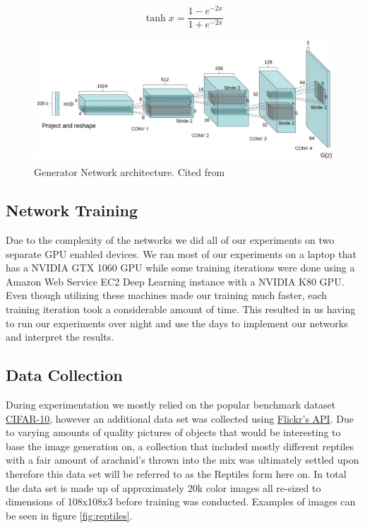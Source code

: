 \begin{equation}
\label{tanh-equation}
\tanh x = \frac{1 - e^{-2x}}{1 + e^{-2x}}
\end{equation}

\begin{figure}[h]
\centering
\includegraphics[width=\textwidth]{figures/DCGAN.png}
\caption{Generator Network architecture. Cited from \cite{DBLP:journals/corr/RadfordMC15} }
\label{fig:architecture}
\end{figure}

\subsection{Network Training}
Due to the complexity of the networks we did all of our experiments on two separate GPU enabled devices. We ran most of our experiments on a laptop that has a NVIDIA GTX 1060 GPU while some training iterations were done using a Amazon Web Service EC2 Deep Learning instance with a NVIDIA K80 GPU. Even though utilizing these machines made our training much faster, each training iteration took a considerable amount of time. This resulted in us having to run our experiments over night and use the days to implement our networks and interpret the results. 

\subsection{Data Collection}

During experimentation we mostly relied on the popular benchmark dataset \href{https://www.cs.toronto.edu/~kriz/cifar.html}{CIFAR-10}, however an additional data set was collected using \href{https://www.flickr.com/services/api/}{Flickr's API}. Due to varying amounts of quality pictures of objects that would be interesting to base the image generation on, a collection that included mostly different reptiles with a fair amount of arachnid's thrown into the mix was ultimately settled upon therefore this data set will be referred to as the Reptiles form here on. In total the data set is made up of approximately 20k color images all re-sized to dimensions of 108x108x3 before training was conducted. Examples of images can be seen in figure \ref{fig:reptiles}.


